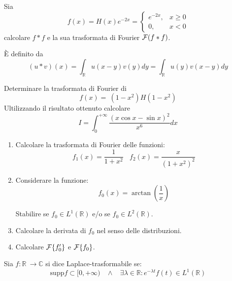 Sia
\begin{equation*}
f( x) =H( x) e^{-2x} =\begin{cases}
e^{-2x} , & x\geqslant 0\\
0, & x< 0
\end{cases}
\end{equation*}
calcolare $\displaystyle f*f$ e la sua trasformata di Fourier $\displaystyle \mathcal{F} ( f*f)$.
\begin{rem}
 È definito da
\begin{equation*}
( u*v)( x) =\int _{\mathbb{R}} u( x-y) v( y) dy=\int _{\mathbb{R}} u( y) v( x-y) dy
\end{equation*}
\end{rem}
\Esercizio{}

Determinare la trasformata di Fourier di
\begin{equation*}
f( x) =\ \left( 1-x^{2}\right) H\left( 1-x^{2}\right)
\end{equation*}
Ultilizzando il risultato ottenuto calcolare
\begin{equation*}
I=\int ^{+\infty }_{0}\frac{( x\cos x-\sin x)^{2}}{x^{6}} dx
\end{equation*}
\Esercizio{}
\begin{enumerate}
\item Calcolare la trasformata di Fourier delle funzioni:\begin{equation*}
f_{1}( x) =\frac{1}{1+x^{2}} \ \ \ \ f_{2}( x) =\frac{x}{\left( 1+x^{2}\right)^{2}}
\end{equation*}
\item Considerare la funzione:\begin{equation*}
f_{0}( x) =\arctan\left(\frac{1}{x}\right)
\end{equation*}

Stabilire se $\displaystyle f_{0} \in L^{1}(\mathbb{R})$ e/o se $\displaystyle f_{0} \in L^{2}(\mathbb{R})$.
\item Calcolare la derivata di $\displaystyle f_{0}$ nel senso delle distribuzioni.
\item Calcolare $\mathcal{F} \{f'_{0}\}$ e $\mathcal{F} \{f_{0}\}$.
\end{enumerate}
\Esercizio{}
\begin{defn}
Sia $\displaystyle f:\mathbb{R} \ \rightarrow \mathbb{C}$ si dice Laplace-trasformabile se:
\begin{equation*}
\mathrm{supp} f\subset [ 0,+\infty ) \ \ \ \ \land \ \ \ \ \exists \lambda \in \mathbb{R} :e^{-\lambda t} f( t) \in L^{1}(\mathbb{R})
\end{equation*}
\end{defn}
